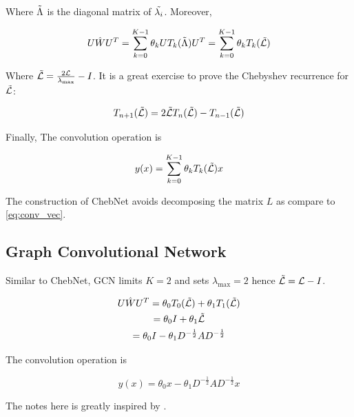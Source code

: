 \documentclass{article}
\begin{document}
Where $\Tilde{\Lambda}$ is the diagonal matrix of $\Tilde{\lambda_i}$. Moreover,

\begin{equation}
    U \hat{W} U^T = \sum_{k=0}^{K-1} \theta_k U T_k(\Tilde{\Lambda}) U^T = \sum_{k=0}^{K-1} \theta_k T_k(\Tilde{\mathcal{L}})
\end{equation}

Where $\Tilde{\mathcal{L}} = \frac{2 \mathcal{L}}{\lambda_{\max}} - I$. It is a great exercise to prove the Chebyshev recurrence for $\Tilde{\mathcal{L}}$:

\begin{equation}
    T_{n+1}(\Tilde{\mathcal{L}}) = 2 \Tilde{\mathcal{L}} T_n(\Tilde{\mathcal{L}}) - T_{n-1}(\Tilde{\mathcal{L}})
\end{equation}



Finally, The convolution operation is

\begin{equation}
    y(x) = \sum_{k=0}^{K-1} \theta_k T_k(\Tilde{\mathcal{L}}) x
\end{equation}

The construction of ChebNet avoids decomposing the matrix $L$ as compare to \ref{eq:conv_vec}.

\subsection{Graph Convolutional Network}

Similar to ChebNet, GCN \cite{kipf2016semi} limits $K = 2$ and sets $\lambda_{\max} = 2$ hence $\Tilde{\mathcal{L}} = \mathcal{L} - I$.

\begin{gather*}
    U \hat{W} U^T = \theta_0 T_0(\Tilde{\mathcal{L}}) + \theta_1 T_1(\Tilde{\mathcal{L}}) \\
    = \theta_0 I + \theta_1 \Tilde{\mathcal{L}} \\
    = \theta_0 I - \theta_1 D^{-\frac{1}{2}} A D^{-\frac{1}{2}}
\end{gather*}

The convolution operation is

\begin{equation}
    y(x) = \theta_0 x - \theta_1 D^{-\frac{1}{2}} A D^{-\frac{1}{2}} x
\end{equation}

The notes here is greatly inspired by \cite{chen2020note}.



\end{document}
